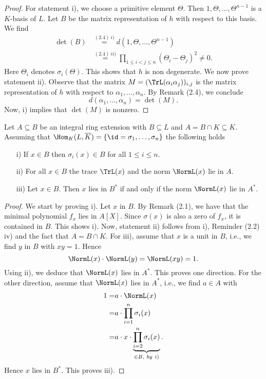 \begin{proof}
	For statement i), we choose a primitive element $\Theta$. Then $1, \Theta,\dots,\Theta^{n-1}$ is a $K$-basis of $L$. Let $B$ be the matrix representation of $h$ with respect to this basis. We find
	\begin{align*}
		\det(B)&\stackrel{(2.4)~i)}{=}d(1,\Theta,\dots,\Theta^{n-1})\\
		&\stackrel{(2.4)~ii)}{=} \prod_{1\le i<j\le n} (\Theta_i-\Theta_j)^2 \neq 0.
	\end{align*}
	Here $\Theta_i$ denotes $\sigma_i(\Theta)$. This shows that $h$ is non degenerate. We now prove statement ii). Observe that the matrix $M=(\TrL(\alpha_i\alpha_j))_{i,j}$ is the matrix representation of $h$ with respect to $\alpha_1,\dots,\alpha_n$. By Remark (2.4), we conclude
	$$d(\alpha_1,\dots,\alpha_n)=\det(M).$$
	Now, i) implies that $\det(M)$ is nonzero.
\end{proof}

\begin{Bem}
	Let $A\subseteq B$ be an integral ring extension with $B\subseteq L$ and $A=B\cap K\subseteq K$. Assuming that $\Hom_K(L,\overline{K})=\{\id=\sigma_1,\dots,\sigma_n \}$ the following holds
		\begin{itemize}
			\item [i)] If $x\in B$ then $\sigma_i(x)\in B$ for all $1\le i \le n$. 
			\item [ii)] For all $x\in B$ the trace $\TrL(x)$ and the norm $\NormL(x)$ lie in $A$.
			\item [iii)]  Let $x\in B$. Then $x$ lies in $B^*$ if and only if the norm $\NormL(x)$ lie in $A^*$.
		\end{itemize}
\end{Bem}

\begin{proof}
	We start by proving i). Let $x$ in $B$. By Remark (2.1), we have that the minimal polynomial $f_x$ lies in $A[X]$. Since $\sigma(x)$ is also a zero of $f_x$, it is contained in $B$. This shows i). Now, statement ii) follows from i), Reminder (2.2) iv) and the fact that $A=B\cap K$. For iii), assume that $x$ is a unit in $B$, i.e., we find $y$ in $B$ with $xy=1$. Hence $$\NormL(x)\cdot\NormL(y)=\NormL(xy)=1.$$ Using ii), we deduce that $\NormL(x)$ lies in $A^*$. This proves one direction. For the other direction, assume that $\NormL(x)$ lies in $A^*$, i.e., we find $a\in A$ with 
	\begin{align*}
		1=&a\cdot\NormL(x)\\
		=&a\cdot\prod_{i=1}^{n}\sigma_i(x)\\
		=&a\cdot x\cdot\underbrace{\prod_{i=2}^{n}\sigma_i(x)}_{\in B, ~by~ i)}.
	\end{align*}
	Hence $x$ lies in $B^*$. This proves iii).
\end{proof}

